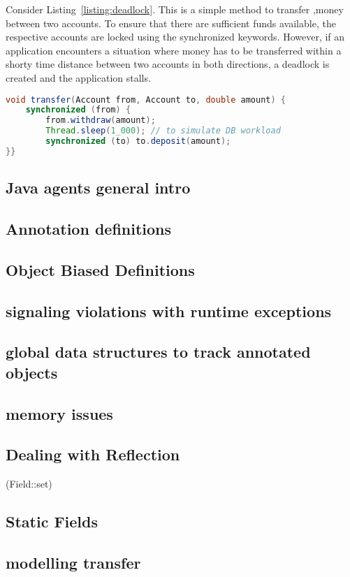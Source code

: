 \documentclass[JDala.tex]{subfiles}
\begin{document}
Consider Listing~\ref{listing:deadlock}.  This is a simple method to transfer ,money between two accounts. To ensure that there are sufficient funds available, the respective accounts are locked using the  synchronized keywords.  However, if an application encounters a situation where money has to be transferred within a shorty time distance between two accounts in both directions, a deadlock is created and the application stalls.

\begin{lstlisting}[language=Java, caption=Money transfer implementation prone to deadlock, label=listing:deadlock]
void transfer(Account from, Account to, double amount) {
	synchronized (from) {
		from.withdraw(amount);
		Thread.sleep(1_000); // to simulate DB workload
		synchronized (to) to.deposit(amount);
}}
\end{lstlisting}



	
\subsection{Java agents general intro}

\subsection{Annotation definitions}

\subsection{Object Biased Definitions}

\subsection{signaling violations with runtime exceptions}

\subsection{global data structures to track annotated objects}

\subsection{memory issues}

\subsection{Dealing with Reflection}
(Field::set)

\subsection{Static Fields}

\subsection{modelling transfer}
\end{document}
